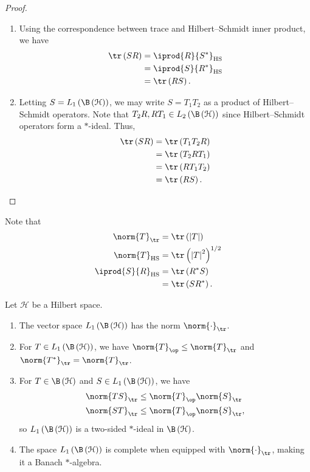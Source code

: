 \documentclass[10pt]{mypackage}
\DeclareMathOperator{\hs}{HS}
\begin{document}
\begin{proof}\hfill
  \begin{enumerate}[(1)]
    \item Using the correspondence between trace and Hilbert--Schmidt inner product, we have
      \begin{align*}
        \tr\left( SR \right) &= \iprod{R}{S^{\ast}}_{\hs}\\
                             &= \iprod{S}{R^{\ast}}_{\hs}\\
                             &= \tr\left( RS \right).
      \end{align*}
    \item Letting $S = L_1\left( \B\left( \mathcal{H} \right) \right)$, we may write $S = T_1T_2$ as a product of Hilbert--Schmidt operators. Note that $T_2R,RT_1\in L_2\left( \B\left( \mathcal{H} \right) \right)$ since Hilbert--Schmidt operators form a $\ast$-ideal. Thus,
      \begin{align*}
        \tr\left( SR \right) &= \tr\left( T_1T_2R \right)\\
                             &= \tr\left( T_2RT_1 \right)\\
                             &= \tr\left( RT_1T_2 \right)\\
                             &= \tr\left( RS \right).
      \end{align*}
  \end{enumerate}
\end{proof}
Note that
\begin{align*}
  \norm{T}_{\tr} &= \tr\left( \left\vert T \right\vert \right)\\
  \norm{T}_{\hs} &= \tr\left( \left\vert T \right\vert^2 \right)^{1/2}\\
  \iprod{S}{R}_{\hs} &= \tr\left( R^{\ast}S \right) \\
                     &= \tr\left( SR^{\ast} \right).
\end{align*}
\begin{theorem}
  Let $\mathcal{H}$ be a Hilbert space. 
  \begin{enumerate}[(1)]
    \item The vector space $L_1\left( \B\left( \mathcal{H} \right) \right)$ has the norm $\norm{\cdot}_{\tr}$.
    \item For $T\in L_1\left( \B\left( \mathcal{H} \right) \right)$, we have $\norm{T}_{\op}\leq \norm{T}_{\tr}$ and $\norm{T^{\ast}}_{\tr} = \norm{T}_{\tr}$.
    \item For $T\in \B\left( \mathcal{H} \right)$ and $S\in L_1\left( \B\left( \mathcal{H} \right) \right)$, we have
      \begin{align*}
        \norm{TS}_{\tr} &\leq \norm{T}_{\op}\norm{S}_{\tr}\\
        \norm{ST}_{\tr} &\leq \norm{T}_{\op}\norm{S}_{\tr},
      \end{align*}
      so $L_1\left( \B\left( \mathcal{H} \right) \right)$ is a two-sided $\ast$-ideal in $\B\left( \mathcal{H} \right)$.
    \item The space $L_1\left( \B\left( \mathcal{H} \right) \right)$ is complete when equipped with $\norm{\cdot}_{\tr}$, making it a Banach $\ast$-algebra.
  \end{enumerate}
\end{theorem}
\end{document}
